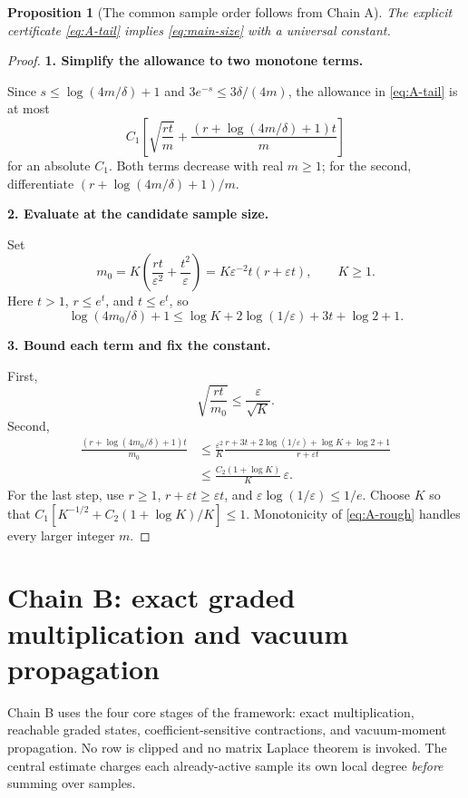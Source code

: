 \documentclass[11pt]{article}
\numberwithin{equation}{section}
\newtheorem{proposition}[theorem]{Proposition}
\theoremstyle{definition}\newtheorem{definition}[theorem]{Definition}
\theoremstyle{remark}\newtheorem{remark}[theorem]{Remark}
\newcommand{\step}[1]{\par\addvspace{.65\baselineskip}\Needspace{4\baselineskip}\noindent\textbf{#1}\par\nobreak\smallskip}
\begin{document}
\begin{proposition}[The common sample order follows from Chain A]\label{prop:A-size}
The explicit certificate \eqref{eq:A-tail} implies \eqref{eq:main-size} with a
universal constant.
\end{proposition}
\begin{proof}
\step{1. Simplify the allowance to two monotone terms.}
Since $s\le\log(4m/\delta)+1$ and $3e^{-s}\le3\delta/(4m)$, the allowance in
\eqref{eq:A-tail} is at most
\begin{equation}\label{eq:A-rough}
 C_1\left[\sqrt{\frac{rt}{m}}+
 \frac{(r+\log(4m/\delta)+1)t}{m}\right]
\end{equation}
for an absolute $C_1$. Both terms decrease with real $m\ge1$; for the second,
differentiate $(r+\log(4m/\delta)+1)/m$.

\step{2. Evaluate at the candidate sample size.}
Set
\[
 m_0=K\left(\frac{rt}{\varepsilon^2}+\frac{t^2}{\varepsilon}\right)
 =K\varepsilon^{-2}t(r+\varepsilon t),\qquad K\ge1.
\]
Here $t>1$, $r\le e^t$, and $t\le e^t$, so
\[
 \log(4m_0/\delta)+1
 \le\log K+2\log(1/\varepsilon)+3t+\log2+1.
\]

\step{3. Bound each term and fix the constant.}
First,
\[
 \sqrt{\frac{rt}{m_0}}\le\frac\varepsilon{\sqrt K}.
\]
Second,
\begin{align*}
 \frac{(r+\log(4m_0/\delta)+1)t}{m_0}
 &\le\frac{\varepsilon^2}{K}
 \frac{r+3t+2\log(1/\varepsilon)+\log K+\log2+1}{r+\varepsilon t}\\
 &\le\frac{C_2(1+\log K)}K\,\varepsilon.
\end{align*}
For the last step, use $r\ge1$, $r+\varepsilon t\ge\varepsilon t$, and
$\varepsilon\log(1/\varepsilon)\le1/e$.
Choose $K$ so that $C_1[K^{-1/2}+C_2(1+\log K)/K]\le1$.
Monotonicity of \eqref{eq:A-rough} handles every larger integer $m$.
\end{proof}

\clearpage
\section{Chain B: exact graded multiplication and vacuum propagation}\label{sec:B}
\begin{takeaway}
Chain B uses the four core stages of the framework: exact multiplication,
reachable graded states, coefficient-sensitive contractions, and vacuum-moment
propagation. No row is clipped and no matrix Laplace theorem is invoked.
The central estimate charges each already-active sample its own local degree
\emph{before} summing over samples.
\end{takeaway}
\end{document}
